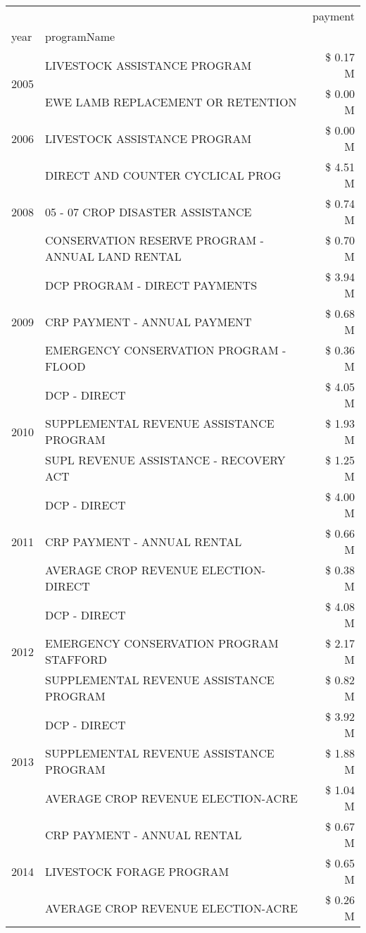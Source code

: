 \begin{tabular}{llr}
\toprule
 &  & payment \\
year & programName &  \\
\midrule
\multirow[t]{2}{*}{2005} & LIVESTOCK ASSISTANCE PROGRAM & \$ 0.17 M \\
 & EWE LAMB REPLACEMENT OR RETENTION & \$ 0.00 M \\
\cline{1-3}
2006 & LIVESTOCK ASSISTANCE PROGRAM & \$ 0.00 M \\
\cline{1-3}
\multirow[t]{3}{*}{2008} & DIRECT AND COUNTER CYCLICAL PROG & \$ 4.51 M \\
 & 05 - 07 CROP DISASTER ASSISTANCE & \$ 0.74 M \\
 & CONSERVATION RESERVE PROGRAM - ANNUAL LAND RENTAL & \$ 0.70 M \\
\cline{1-3}
\multirow[t]{3}{*}{2009} & DCP PROGRAM - DIRECT PAYMENTS & \$ 3.94 M \\
 & CRP PAYMENT - ANNUAL PAYMENT & \$ 0.68 M \\
 & EMERGENCY CONSERVATION PROGRAM - FLOOD & \$ 0.36 M \\
\cline{1-3}
\multirow[t]{3}{*}{2010} & DCP - DIRECT & \$ 4.05 M \\
 & SUPPLEMENTAL REVENUE ASSISTANCE PROGRAM & \$ 1.93 M \\
 & SUPL REVENUE ASSISTANCE - RECOVERY ACT & \$ 1.25 M \\
\cline{1-3}
\multirow[t]{3}{*}{2011} & DCP - DIRECT & \$ 4.00 M \\
 & CRP PAYMENT - ANNUAL RENTAL & \$ 0.66 M \\
 & AVERAGE CROP REVENUE ELECTION-DIRECT & \$ 0.38 M \\
\cline{1-3}
\multirow[t]{3}{*}{2012} & DCP - DIRECT & \$ 4.08 M \\
 & EMERGENCY CONSERVATION PROGRAM STAFFORD & \$ 2.17 M \\
 & SUPPLEMENTAL REVENUE ASSISTANCE PROGRAM & \$ 0.82 M \\
\cline{1-3}
\multirow[t]{3}{*}{2013} & DCP - DIRECT & \$ 3.92 M \\
 & SUPPLEMENTAL REVENUE ASSISTANCE PROGRAM & \$ 1.88 M \\
 & AVERAGE CROP REVENUE ELECTION-ACRE & \$ 1.04 M \\
\cline{1-3}
\multirow[t]{3}{*}{2014} & CRP PAYMENT - ANNUAL RENTAL & \$ 0.67 M \\
 & LIVESTOCK FORAGE PROGRAM & \$ 0.65 M \\
 & AVERAGE CROP REVENUE ELECTION-ACRE & \$ 0.26 M \\

\end{tabular}
